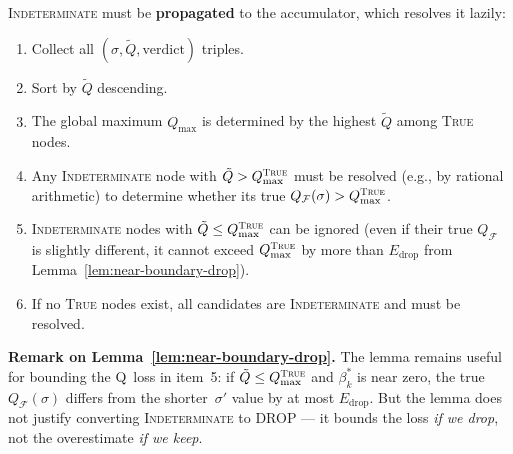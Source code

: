 \begin{remark}
\textsc{Indeterminate} must be \textbf{propagated} to the
accumulator, which resolves it lazily:
\begin{enumerate}
  \item Collect all $(\sigma, \tilde Q, \text{verdict})$ triples.
  \item Sort by $\tilde Q$ descending.
  \item The global maximum $Q_{\max}$ is determined by the
    highest $\tilde Q$ among \textsc{True} nodes.
  \item Any \textsc{Indeterminate} node with
    $\tilde Q > Q_{\max}^{\textsc{True}}$
    must be resolved (e.g., by rational arithmetic) to determine
    whether its true $Q_{\mathcal{F}}(\sigma) > Q_{\max}^{\textsc{True}}$.
  \item \textsc{Indeterminate} nodes with
    $\tilde Q \leq Q_{\max}^{\textsc{True}}$ can be ignored
    (even if their true $Q_{\mathcal{F}}$ is slightly different,
    it cannot exceed $Q_{\max}^{\textsc{True}}$ by more than
    $E_{\mathrm{drop}}$ from Lemma~\ref{lem:near-boundary-drop}).
  \item If no \textsc{True} nodes exist, all candidates are
    \textsc{Indeterminate} and must be resolved.
\end{enumerate}

\medskip\noindent
\textbf{Remark on Lemma~\ref{lem:near-boundary-drop}.}
The lemma remains useful for bounding the Q~loss in item~5:
if $\tilde Q \leq Q_{\max}^{\textsc{True}}$ and $\beta^*_k$
is near zero, the true $Q_{\mathcal{F}}(\sigma)$ differs from
the shorter~$\sigma'$ value by at most $E_{\mathrm{drop}}$.
But the lemma does not justify converting \textsc{Indeterminate}
to DROP --- it bounds the loss \emph{if we drop}, not the
overestimate \emph{if we keep}.
\end{remark}



